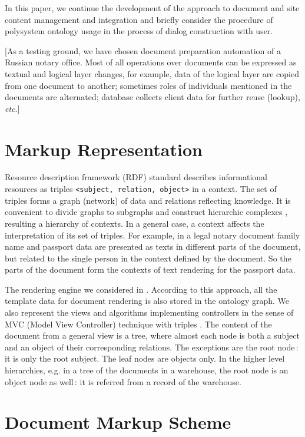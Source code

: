 \documentclass[conference]{IEEEtran}
\newcommand{\e}[2][fcolor]{\textcolor{pcolor}{[}\textcolor{#1}{#2}\textcolor{pcolor}{]}}
\begin{document}
In this paper, we continue the development of the approach to document
and site content management and integration \cite{prevwork} and
briefly consider the procedure of polysystem ontology usage in the
process of dialog construction with user.

\e{As a testing ground, we have chosen document preparation automation of
a Russian notary office. Most of all operations over documents can be
expressed as textual and logical layer changes, for example, data of
the logical layer are copied from one document to another; sometimes
roles of individuals mentioned in the documents are alternated;
database collects client data for further reuse (lookup), \emph{etc}.}

\section{Markup Representation}

Resource description framework (RDF) standard describes informational
resources as triples \texttt{<subject, relation, object>} in a
context.  The set of triples forms a graph (network) of data and
relations reflecting knowledge.  It is convenient to divide graphs to
subgraphs and construct hierarchic complexes \cite{b4}, resulting a
hierarchy of contexts.  In a general case, a context affects the
interpretation of its set of triples.  For example, in a legal notary
document family name and passport data are presented as texts in
different parts of the document, but related to the single person in
the context defined by the document.  So the parts of the document
form the contexts of text rendering for the passport data.

The rendering engine we considered in \cite{prevwork}.  According to
this approach, all the template data for document rendering is also
stored in the ontology graph.  We also represent the views and
algorithms implementing controllers in the sense of MVC (Model View
Controller) \cite{b2:5} technique with triples \cite{b5}.  The content
of the document from a general view is a tree, where almost each node
is both a subject and an object of their corresponding relations.  The
exceptions are the root node\,: it is only the root subject.  The leaf
nodes are objects only.  In the higher level hierarchies, e.g. in a
tree of the documents in a warehouse, the root node is an object node
as well\,: it is referred from a record of the warehouse.

\section{Document Markup Scheme}
\label{sec:scheme}
\end{document}
